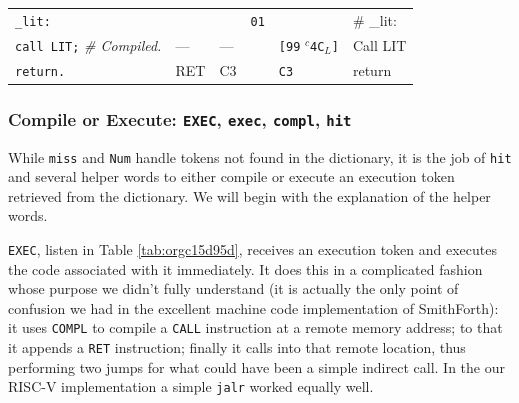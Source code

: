 \documentclass[a4paper,12pt,final]{article}
\begin{document}
\begin{table}[!htbp]
\begin{adjustwidth}{-1cm}{-1cm}
\begin{center}
\begin{tabular}{l|ll|l|lH}
\texttt{\_lit:} &  &  & \texttt{01} &  & \# \_lit:\\[0pt]
\hspace{1.053000em} \texttt{call LIT;}  \emph{\# Compiled.} & --- & --- &  & \texttt{[99} \(^{c}\)​\texttt{4C}​\(_{L}\)​\texttt{]} & Call LIT\\[0pt]
\hspace{1.053000em} \texttt{return.} & RET & C3 &  & \texttt{C3} & return\\[0pt]
\end{tabular}

\end{center}
\normalsize \end{adjustwidth} \end{table} \vspace{0}
\clearpage

\subsubsection{Compile or Execute: \texttt{EXEC}, \texttt{exec}, \texttt{compl}, \texttt{hit}}
\label{sec:org2028f7c}

While \texttt{miss} and \texttt{Num} handle tokens not found in the dictionary, it
is the job of \texttt{hit} and several helper words to either compile or
execute an execution token retrieved from the dictionary.  We will
begin with the explanation of the helper words.

\texttt{EXEC}, listen in Table \ref{tab:orgc15d95d}, receives an execution token
and executes the code associated with it immediately.  It does this in
a complicated fashion whose purpose we didn't fully understand (it is
actually the only point of confusion we had in the excellent machine
code implementation of SmithForth): it uses \texttt{COMPL} to compile a
\texttt{CALL} instruction at a remote memory address; to that it appends a
\texttt{RET} instruction; finally it calls into that remote location, thus
performing two jumps for what could have been a simple indirect call.
In the our RISC-V implementation a simple \texttt{jalr} worked equally well.
\end{document}
